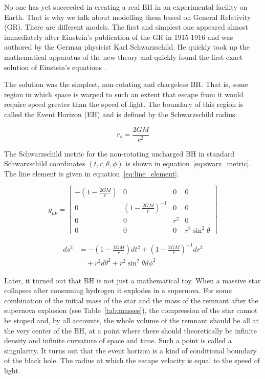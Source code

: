 \documentclass[fleqn,usenatbib]{mnras}
\begin{document}
No one has yet succeeded in creating a real BH in an experimental facility on Earth. That is why we talk about modelling them based on General Relativity (GR). There are different models. The first and simplest one appeared almost immediately after Einstein's publication of the GR in 1915-1916 and was authored by the German physicist Karl Schwarzschild. He quickly took up the mathematical apparatus of the new theory and quickly found the first exact solution of Einstein's equations \citet{schwarzschild1999}. 

The solution was the simplest, non-rotating and chargeless BH. That is, some region in which space is warped to such an extent that escape from it would require speed greater than the speed of light. The boundary of this region is called the Event Horizon (EH) and is defined by the Schwarzschild radius:

\begin{equation*}
	r_s = \frac{2GM}{c^2}
\end{equation*}

The Schwarzschild metric for the non-rotating uncharged BH in standard Schwarzschild coordinates $(t, r, \theta, \phi)$ is shown in equation~\ref{eq:swarz_metric}. The line element is given in equation~\ref{eq:line_element}.

\begin{equation}
g_{\mu\nu} =
\begin{bmatrix}
	-\left(1 - \frac{2GM}{r}\right) & 0 & 0 & 0 \\
	0 & \left(1 - \frac{2GM}{r}\right)^{-1} & 0 & 0 \\
	0 & 0 & r^2 & 0 \\
	0 & 0 & 0 & r^2 \sin^2 \theta
	\label{eq:swarz_metric}
\end{bmatrix}
\end{equation}

\begin{equation}
	\begin{split}
		ds^2 &= -\left( 1 - \frac{2GM}{r} \right) dt^2 
		+ \left( 1 - \frac{2GM}{r} \right)^{-1} dr^2 \\
		&\quad + r^2 d\theta^2 
		+ r^2 \sin^2 \theta d\phi^2
	\end{split}
	\label{eq:line_element}
\end{equation}

Later, it turned out that BH is not just a mathematical toy. When a massive star collapses after consuming hydrogen it explodes in a supernova. For some combination of the initial mass of the star and the mass of the remnant after the supernova explosion (see Table~\ref{tab:masses}), the compression of the star cannot be stoped and, by all accounts, the whole volume of the remnant should be all at the very center of the BH, at a point where there should theoretically be infinite density and infinite curvature of space and time. Such a point is called a singularity. It turns out that the event horizon is a kind of conditional boundary of the black hole. The radius at which the escape velocity is equal to the speed of light.
\end{document}
